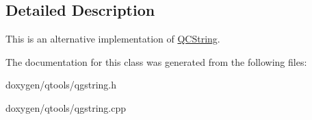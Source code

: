 \subsection{Detailed Description}
This is an alternative implementation of \mbox{\hyperlink{class_q_c_string}{Q\+C\+String}}. 

The documentation for this class was generated from the following files\+:\begin{DoxyCompactItemize}
\item 
doxygen/qtools/qgstring.\+h\item 
doxygen/qtools/qgstring.\+cpp\end{DoxyCompactItemize}

